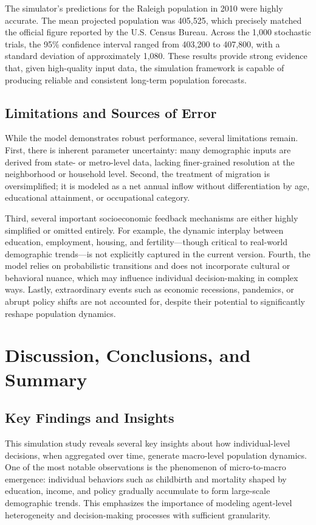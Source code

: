 \documentclass[12pt]{article}
\begin{document}
The simulator's predictions for the Raleigh population in 2010 were highly accurate. The mean projected population was 405,525, which precisely matched the official figure reported by the U.S. Census Bureau. Across the 1,000 stochastic trials, the 95\% confidence interval ranged from 403,200 to 407,800, with a standard deviation of approximately 1,080. These results provide strong evidence that, given high-quality input data, the simulation framework is capable of producing reliable and consistent long-term population forecasts.

\subsection{Limitations and Sources of Error}

While the model demonstrates robust performance, several limitations remain. First, there is inherent parameter uncertainty: many demographic inputs are derived from state- or metro-level data, lacking finer-grained resolution at the neighborhood or household level. Second, the treatment of migration is oversimplified; it is modeled as a net annual inflow without differentiation by age, educational attainment, or occupational category.

Third, several important socioeconomic feedback mechanisms are either highly simplified or omitted entirely. For example, the dynamic interplay between education, employment, housing, and fertility—though critical to real-world demographic trends—is not explicitly captured in the current version. Fourth, the model relies on probabilistic transitions and does not incorporate cultural or behavioral nuance, which may influence individual decision-making in complex ways. Lastly, extraordinary events such as economic recessions, pandemics, or abrupt policy shifts are not accounted for, despite their potential to significantly reshape population dynamics.


\newpage
\section{Discussion, Conclusions, and Summary}

\subsection{Key Findings and Insights}

This simulation study reveals several key insights about how individual-level decisions, when aggregated over time, generate macro-level population dynamics. One of the most notable observations is the phenomenon of micro-to-macro emergence: individual behaviors such as childbirth and mortality shaped by education, income, and policy gradually accumulate to form large-scale demographic trends. This emphasizes the importance of modeling agent-level heterogeneity and decision-making processes with sufficient granularity.
\end{document}
